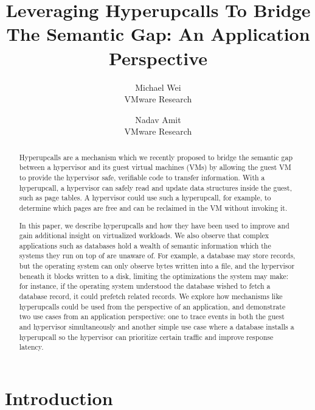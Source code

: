 \documentclass[11pt]{article}
\begin{document}
\title{Leveraging Hyperupcalls To Bridge The Semantic Gap: An Application Perspective}

\date{}

\author{
{\rm Michael Wei}\\
VMware Research
\and
{\rm Nadav Amit}\\
VMware Research
} 

\maketitle

\begin{abstract}

Hyperupcalls are a mechanism which we recently proposed
to bridge the semantic gap between a hypervisor
and its guest virtual machines (VMs) by allowing the guest VM
to provide the hypervisor safe, verifiable code to transfer information.
With a hyperupcall, a hypervisor can safely read and update data
structures inside the guest, such as page tables. A hypervisor could
use such a hyperupcall, for example, to determine which pages are
free and can be reclaimed in the VM without invoking it.

In this paper, we describe hyperupcalls and how they have been used
to improve and gain additional insight on virtualized workloads. We
also observe that complex applications such as databases hold a
wealth of semantic information which the systems they run on top of
are unaware of. For example, a database may store records, but the
operating system can only observe bytes written into a file, and the
hypervisor beneath it blocks written to a disk, limiting the optimizations the
system may make: for instance, if the operating system understood the database
wished to fetch a database record, it could prefetch related records.
We explore how mechanisms like hyperupcalls could be used from
the perspective of an application, and demonstrate two use cases from an application
perspective: one to trace events in both the guest and hypervisor simultaneously and 
another simple use case 
where a database installs a hyperupcall so the hypervisor can prioritize
certain traffic and improve response latency.

\end{abstract}

\section{Introduction}
\label{sec:introduction}
\end{document}
